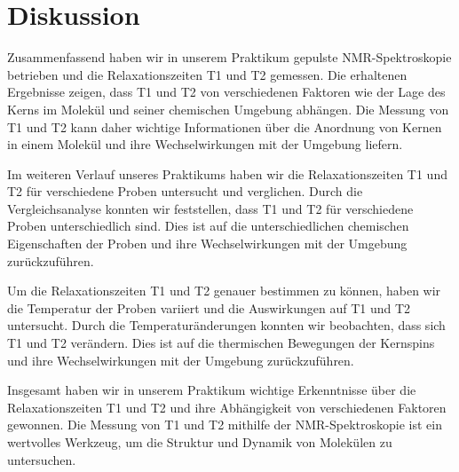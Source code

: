 \section{Diskussion}
\label{sec:Diskussion}



Zusammenfassend haben wir in unserem Praktikum gepulste NMR-Spektroskopie betrieben und die Relaxationszeiten T1 und T2 gemessen. Die erhaltenen Ergebnisse zeigen, dass T1 und T2 von verschiedenen Faktoren wie der Lage des Kerns im Molekül und seiner chemischen Umgebung abhängen. Die Messung von T1 und T2 kann daher wichtige Informationen über die Anordnung von Kernen in einem Molekül und ihre Wechselwirkungen mit der Umgebung liefern.

Im weiteren Verlauf unseres Praktikums haben wir die Relaxationszeiten T1 und T2 für verschiedene Proben untersucht und verglichen. Durch die Vergleichsanalyse konnten wir feststellen, dass T1 und T2 für verschiedene Proben unterschiedlich sind. Dies ist auf die unterschiedlichen chemischen Eigenschaften der Proben und ihre Wechselwirkungen mit der Umgebung zurückzuführen.

Um die Relaxationszeiten T1 und T2 genauer bestimmen zu können, haben wir die Temperatur der Proben variiert und die Auswirkungen auf T1 und T2 untersucht. Durch die Temperaturänderungen konnten wir beobachten, dass sich T1 und T2 verändern. Dies ist auf die thermischen Bewegungen der Kernspins und ihre Wechselwirkungen mit der Umgebung zurückzuführen.

Insgesamt haben wir in unserem Praktikum wichtige Erkenntnisse über die Relaxationszeiten T1 und T2 und ihre Abhängigkeit von verschiedenen Faktoren gewonnen. Die Messung von T1 und T2 mithilfe der NMR-Spektroskopie ist ein wertvolles Werkzeug, um die Struktur und Dynamik von Molekülen zu untersuchen.
